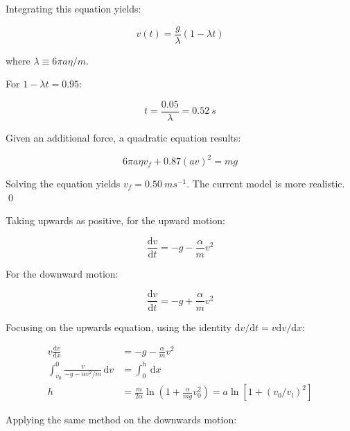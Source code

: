 \documentclass[12pt]{article}
\begin{document}
Integrating this equation yields:

\begin{equation}
    v(t) = \frac{g}{\lambda} (1 - \lambda t)
\end{equation}

where $\lambda \equiv 6\pi a \eta/m$.

For $1 - \lambda t = 0.95$:

\begin{equation}
    t = \frac{0.05}{\lambda} = \qty{0.52}{s}
\end{equation}

Given an additional force, a quadratic equation results:

\begin{equation}
    6\pi a \eta v_{f} + 0.87 (av)^{2} = mg
\end{equation}

Solving the equation yields $v_{f} = \qty{0.50}{ms^{-1}}$. The current model is more realistic.
\qed



Taking upwards as positive, for the upward motion:

\begin{equation}
    \frac{\mathrm{d}v}{\mathrm{d}t} = -g - \frac{\alpha}{m} v^{2}
\end{equation}

For the downward motion:

\begin{equation}
    \frac{\mathrm{d}v}{\mathrm{d}t} = -g + \frac{\alpha}{m} v^{2}
\end{equation}

Focusing on the upwards equation, using the identity $\mathrm{d}v/\mathrm{d}t = v \mathrm{d}v/\mathrm{d}x$:

\begin{equation}
\begin{split}
    v \frac{\mathrm{d}v}{\mathrm{d}x} &= -g - \frac{\alpha}{m} v^{2} \\
    \int_{v_{0}}^{0} \frac{v}{-g - \alpha v^{2}/m} \, \mathrm{d}v &= \int_{0}^{h} \, \mathrm{d}x \\
    h &= \frac{m}{2\alpha} \ln{\left( 1 + \frac{\alpha}{mg} v_{0}^{2} \right)} = a \ln{[1 + (v_{0}/v_{l})^{2}]}
\end{split}
\end{equation}

Applying the same method on the downwards motion:
\end{document}
